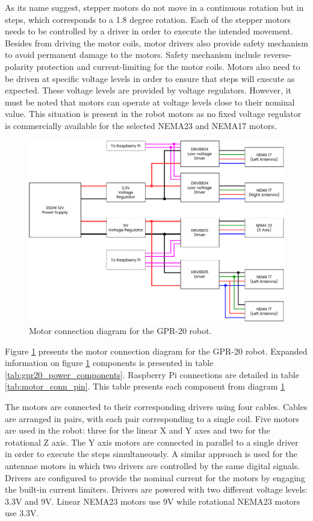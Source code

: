 \documentclass{article}
\begin{document}
 As its name suggest, stepper motors do not move in a continuous rotation but in steps, which corresponds to a 1.8 degree rotation. Each of the stepper motors needs to be controlled by a driver in order to execute the intended movement. Besides from driving the motor coils, motor drivers also provide safety mechanism to avoid permanent damage to the motors. Safety mechanism include reverse-polarity protection and current-limiting for the motor coils. Motors also need to be driven at specific voltage levels in order to ensure that steps will execute as expected. These voltage levels are provided by voltage regulators. However, it must be noted that motors can operate at voltage levels close to their nominal value. This situation is present in the robot motors as no fixed voltage regulator is commercially available for the selected NEMA23 and NEMA17 motors. 

\begin{figure}[h]
    \centering
    \includegraphics[width=\textwidth]{images/electronics/motor/GPR20_motor_conn.pdf}
    \caption{Motor connection diagram for the GPR-20 robot.}
    \label{fig:motor_conn}
\end{figure}

Figure \ref{fig:motor_conn} presents the motor connection diagram for the GPR-20 robot. Expanded information on figure \ref{fig:motor_conn} components is presented in table \ref{tab:gpr20_power_components}. Raspberry Pi connections are detailed in table \ref{tab:motor_conn_pin}. This table presents each component from diagram \ref{fig:motor_conn}

The motors are connected to their corresponding drivers using four cables. Cables are arranged in pairs, with each pair corresponding to a single coil. Five motors are used in the robot: three for the linear X and Y axes and two for the rotational Z axis. The Y axis motors are connected in parallel to a single driver in order to execute the steps simultaneously. A similar approach is used for the antennae motors in which two drivers are controlled by the same digital signals. Drivers are configured to provide the nominal current for the motors by engaging the built-in current limiters. Drivers are powered with two different voltage levels: 3.3V and 9V. Linear NEMA23 motors use 9V while rotational NEMA23 motors use 3.3V.
\end{document}
